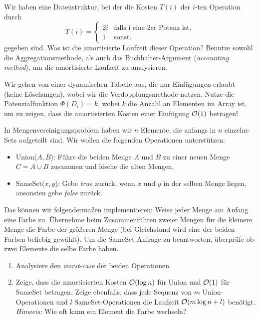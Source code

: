 \documentclass{uebung_cs}
\begin{document}
\begin{aufgabe}
	Wir haben eine Datenstruktur, bei der die Kosten $T(i)$ der $i$-ten Operation durch 
	$$T(i) = \begin{cases} 2i & \text{falls i eine 2er Potenz ist}, \\ 1 & \text{sonst}. \end{cases}$$ 
	gegeben sind.
	Was ist die amortisierte Laufzeit dieser Operation? Benutze sowohl die Aggregationsmethode, als auch das Buchhalter-Argument (\textit{accounting method}), um die amortisierte Laufzeit zu analysieren.
\end{aufgabe}    

\begin{aufgabe}
	Wir gehen von einer dynamischen Tabelle aus, die nur Einfügungen erlaubt (keine Löschungen), wobei wir die Verdopplungsmethode nutzen. Nutze die Potenzialfunktion $\Phi(D_i) = k$, wobei $k$ die Anzahl an Elementen im Array ist, um zu zeigen, dass die amortisierten Kosten einer Einfügung $\mathcal{O}(1)$ betragen!
\end{aufgabe}

\begin{aufgabe}[Mengenvereinigung]
	In Mengenvereinigungsproblem haben wir $n$ Elemente, die anfangs in $n$ einzelne Sets aufgeteilt sind. Wir wollen die folgenden Operationen unterstützen:
	\begin{itemize}
		\item Union($A,B$): Führe die beiden Menge $A$ und $B$ zu einer neuen Menge $C = A \cup B$ zusammen und lösche die alten Mengen.\\
		\item SameSet($x,y$): Gebe \textit{true} zurück, wenn $x$ und $y$ in der selben Menge liegen, ansonsten gebe \textit{false} zurück.
	\end{itemize}
	Das können wir folgendermaßen implementieren: Weise jeder Menge am Anfang eine Farbe zu. Übernehme beim Zusammenführen zweier Mengen für die kleinere Menge die Farbe der größeren Menge (bei Gleichstand wird eine der beiden Farben beliebig gewählt). Um die SameSet Anfrage zu beantworten, überprüfe ob zwei Elemente die selbe Farbe haben.
	\begin{enumerate}
		\item Analysiere den \textit{worst-case} der beiden Operationen.\\
		\item Zeige, dass die amortisierten Kosten $\mathcal{O}(\log n)$ für Union und $\mathcal{O}(1)$ für SameSet betragen. Zeige ebenfalls, dass jede Sequenz von $m$ Union-Operationen und $l$ SameSet-Operationen die Laufzeit $\mathcal{O}(m \log n + l)$ benötigt.\\
		\textit{Hinweis:} Wie oft kann ein Element die Farbe wechseln?
	\end{enumerate}
\end{aufgabe}
\end{document}
